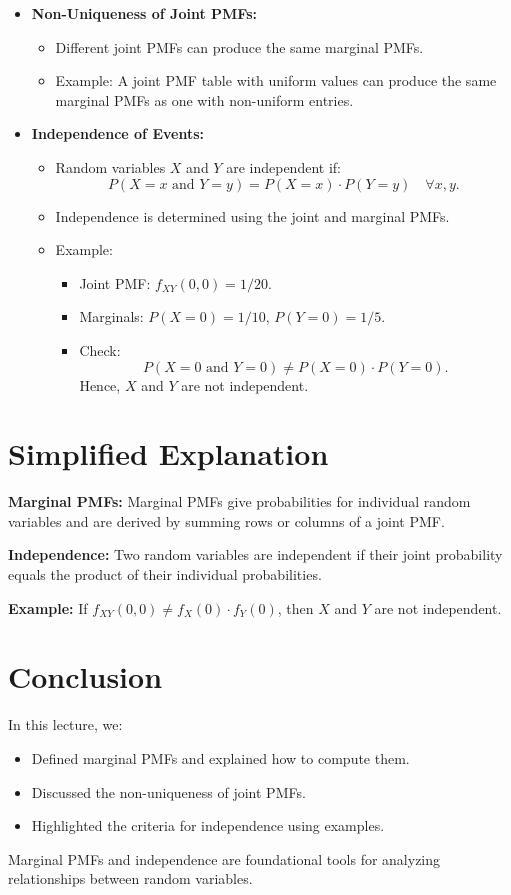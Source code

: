 \documentclass{article}
\begin{document}
\begin{itemize}
  \item \textbf{Non-Uniqueness of Joint PMFs:}
    \begin{itemize}
      \item Different joint PMFs can produce the same marginal PMFs.
      \item Example: A joint PMF table with uniform values can produce the same marginal PMFs as one with non-uniform entries.
    \end{itemize}

  \item \textbf{Independence of Events:}
    \begin{itemize}
      \item Random variables $X$ and $Y$ are independent if:
        \[
          P(X = x \text{ and } Y = y) = P(X = x) \cdot P(Y = y) \quad \forall x, y.
        \]
      \item Independence is determined using the joint and marginal PMFs.
      \item Example:
        \begin{itemize}
          \item Joint PMF: $f_{XY}(0, 0) = 1/20$.
          \item Marginals: $P(X = 0) = 1/10$, $P(Y = 0) = 1/5$.
          \item Check:
            \[
              P(X = 0 \text{ and } Y = 0) \neq P(X = 0) \cdot P(Y = 0).
            \]
            Hence, $X$ and $Y$ are not independent.
        \end{itemize}
    \end{itemize}
\end{itemize}

\section*{Simplified Explanation}

\textbf{Marginal PMFs:}
Marginal PMFs give probabilities for individual random variables and are derived by summing rows or columns of a joint PMF.

\textbf{Independence:}
Two random variables are independent if their joint probability equals the product of their individual probabilities.

\textbf{Example:}
If $f_{XY}(0, 0) \neq f_X(0) \cdot f_Y(0)$, then $X$ and $Y$ are not independent.

\section*{Conclusion}

In this lecture, we:
\begin{itemize}
  \item Defined marginal PMFs and explained how to compute them.
  \item Discussed the non-uniqueness of joint PMFs.
  \item Highlighted the criteria for independence using examples.
\end{itemize}

Marginal PMFs and independence are foundational tools for analyzing relationships between random variables.
\end{document}

